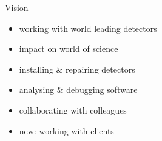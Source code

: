 \begin{frame}{Vision}
%
  \begin{minipage}{.6\textwidth}
    \begin{itemize}\itemspace{4ex}
      \item working with world leading detectors
      \item impact on world of science
      \item installing \& repairing detectors
      \item analysing \& debugging software
      \item collaborating with colleagues
      \item new: working with clients
    \end{itemize}
  \end{minipage}
  \begin{minipage}{.35\textwidth}
  \end{minipage}
%
\end{frame}
